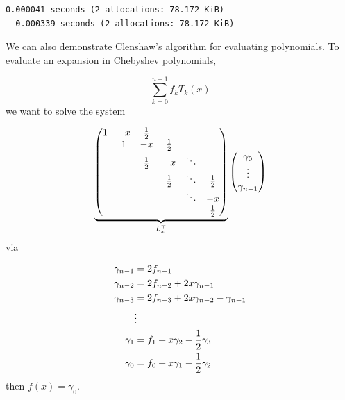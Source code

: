 \documentclass[12pt,a4paper]{article}
\begin{document}
\begin{lstlisting}
0.000041 seconds (2 allocations: 78.172 KiB)
  0.000339 seconds (2 allocations: 78.172 KiB)
\end{lstlisting}


We can also demonstrate Clenshaw's algorithm for evaluating polynomials. To evaluate an expansion in Chebyshev polynomials,

\[
\sum_{k = 0}^{n-1}f_kT_k(x)
\]
we want to solve the system

\[
\underbrace{\begin{pmatrix}
1 & -x & {1\over 2} \\
& 1 & -x & {1\over 2}  \\
& & {1\over 2} & -x & \ddots  \\
& &     & {1\over 2} & \ddots & {1\over 2} \\
&&&&\ddots & -x \\
&&&&& {1\over 2}
\end{pmatrix}}_{L_x^\top} \begin{pmatrix} \gamma_0 \\\vdots\\ \gamma_{n-1} \end{pmatrix}
\]
via


\begin{align*}
\gamma_{n-1} &= 2f_{n-1} \\
\gamma_{n-2} &= 2f_{n-2} + 2x \gamma_{n-1} \\
\gamma_{n-3} &= 2 f_{n-3} + 2x \gamma_{n-2} - \gamma_{n-1} \\
& \vdots \\
\gamma_1 &= f_1 + x \gamma_2 - {1\over 2} \gamma_3 \\
\gamma_0 &= f_0 + x \gamma_1 - {1\over 2} \gamma_2
\end{align*}
then $f(x) = \gamma_0$.
\end{document}
